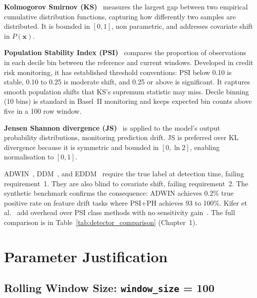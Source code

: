\textbf{Kolmogorov Smirnov (KS)}~\cite{kolmogorov1933,smirnov1948} measures the largest gap between two empirical cumulative distribution functions, capturing how differently two samples are distributed. It is bounded in $[0,1]$, non parametric, and addresses covariate shift in $P(\mathbf{x})$.

\textbf{Population Stability Index (PSI)}~\cite{siddiqi2006,basel2005} compares the proportion of observations in each decile bin between the reference and current windows. Developed in credit risk monitoring, it has established threshold conventions: PSI below 0.10 is stable, 0.10 to 0.25 is moderate shift, and 0.25 or above is significant. It captures smooth population shifts that KS's supremum statistic may miss. Decile binning (10 bins) is standard in Basel~II monitoring and keeps expected bin counts above five in a 100 row window.

\textbf{Jensen Shannon divergence (JS)}~\cite{lin1991,shannon1948} is applied to the model's output probability distributions, monitoring prediction drift. JS is preferred over KL divergence because it is symmetric and bounded in $[0, \ln2]$, enabling normalisation to $[0,1]$.

ADWIN~\cite{bifet2007adwin}, DDM~\cite{gama2004ddm}, and EDDM~\cite{baenagarcia2006eddm} require the true label at detection time, failing requirement~1. They are also blind to covariate shift, failing requirement~2. The synthetic benchmark confirms the consequence: ADWIN achieves 0.2\% true positive rate on feature drift tasks where PSI+PH achieves 93 to 100\%. Kifer et al.~\cite{kifer2004} add overhead over PSI class methods with no sensitivity gain~\cite{rabanser2019}. The full comparison is in Table~\ref{tab:detector_comparison} (Chapter~1).

\section{Parameter Justification}
\label{sec:param_justification}

\subsection{Rolling Window Size: \texttt{window\_size} = 100}
\label{subsec:param_window}


